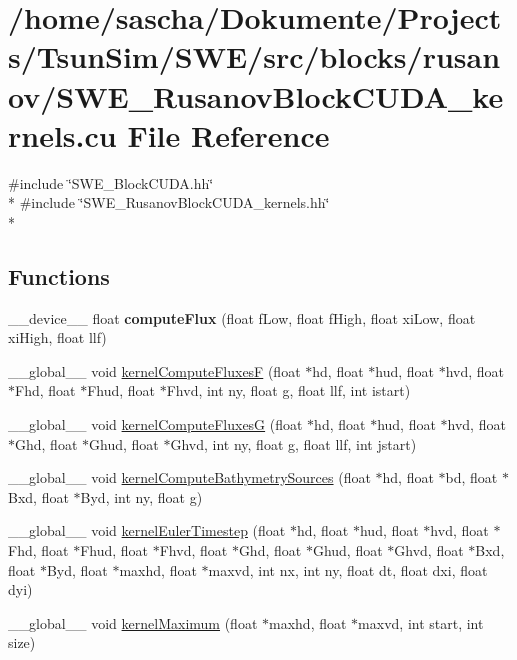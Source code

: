 \hypertarget{SWE__RusanovBlockCUDA__kernels_8cu}{\section{/home/sascha/\-Dokumente/\-Projects/\-Tsun\-Sim/\-S\-W\-E/src/blocks/rusanov/\-S\-W\-E\-\_\-\-Rusanov\-Block\-C\-U\-D\-A\-\_\-kernels.cu File Reference}
\label{SWE__RusanovBlockCUDA__kernels_8cu}
}
{\ttfamily \#include \char`\"{}S\-W\-E\-\_\-\-Block\-C\-U\-D\-A.\-hh\char`\"{}}\\*
{\ttfamily \#include \char`\"{}S\-W\-E\-\_\-\-Rusanov\-Block\-C\-U\-D\-A\-\_\-kernels.\-hh\char`\"{}}\\*
\subsection*{Functions}
\begin{DoxyCompactItemize}
\item 
\hypertarget{SWE__RusanovBlockCUDA__kernels_8cu_a26703ba88a0700f0ce24183c3a9bb81f}{\-\_\-\-\_\-device\-\_\-\-\_\- float {\bfseries compute\-Flux} (float f\-Low, float f\-High, float xi\-Low, float xi\-High, float llf)}\label{SWE__RusanovBlockCUDA__kernels_8cu_a26703ba88a0700f0ce24183c3a9bb81f}

\item 
\-\_\-\-\_\-global\-\_\-\-\_\- void \hyperlink{SWE__RusanovBlockCUDA__kernels_8cu_a125f373796424316bc49a0eb60f5f90e}{kernel\-Compute\-Fluxes\-F} (float $\ast$hd, float $\ast$hud, float $\ast$hvd, float $\ast$Fhd, float $\ast$Fhud, float $\ast$Fhvd, int ny, float g, float llf, int istart)
\item 
\-\_\-\-\_\-global\-\_\-\-\_\- void \hyperlink{SWE__RusanovBlockCUDA__kernels_8cu_a4a5d67e82c837347e337904d4c17cc07}{kernel\-Compute\-Fluxes\-G} (float $\ast$hd, float $\ast$hud, float $\ast$hvd, float $\ast$Ghd, float $\ast$Ghud, float $\ast$Ghvd, int ny, float g, float llf, int jstart)
\item 
\-\_\-\-\_\-global\-\_\-\-\_\- void \hyperlink{SWE__RusanovBlockCUDA__kernels_8cu_aa7530530448af30119436099351cfead}{kernel\-Compute\-Bathymetry\-Sources} (float $\ast$hd, float $\ast$bd, float $\ast$Bxd, float $\ast$Byd, int ny, float g)
\item 
\-\_\-\-\_\-global\-\_\-\-\_\- void \hyperlink{SWE__RusanovBlockCUDA__kernels_8cu_a105ff13519fe40ec2acbc182d5584a07}{kernel\-Euler\-Timestep} (float $\ast$hd, float $\ast$hud, float $\ast$hvd, float $\ast$Fhd, float $\ast$Fhud, float $\ast$Fhvd, float $\ast$Ghd, float $\ast$Ghud, float $\ast$Ghvd, float $\ast$Bxd, float $\ast$Byd, float $\ast$maxhd, float $\ast$maxvd, int nx, int ny, float dt, float dxi, float dyi)
\item 
\-\_\-\-\_\-global\-\_\-\-\_\- void \hyperlink{SWE__RusanovBlockCUDA__kernels_8cu_ae810017f0a27a38e1c5d78c7130e8ab4}{kernel\-Maximum} (float $\ast$maxhd, float $\ast$maxvd, int start, int size)
\end{DoxyCompactItemize}


